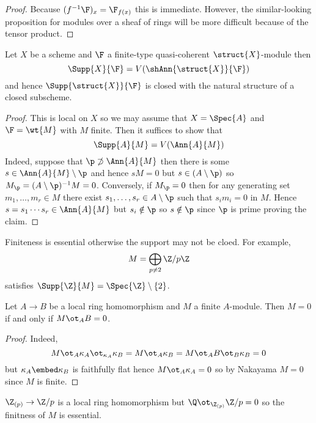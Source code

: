 \documentclass[12pt]{article}
\begin{document}
\begin{proof}
Because $(f^{-1} \F)_x = \F_{f(x)}$ this is immediate. However, the similar-looking proposition for modules over a sheaf of rings will be more difficult because of the tensor product.
\end{proof}

\begin{prop}
Let $X$ be a scheme and $\F$ a finite-type quasi-coherent $\struct{X}$-module then
\[ \Supp{X}{\F} = V(\shAnn{\struct{X}}{\F}) \]
and hence $\Supp{\struct{X}}{\F}$ is closed with the natural structure of a closed subscheme.
\end{prop}

\begin{proof}
This is local on $X$ so we may assume that $X = \Spec{A}$ and $\F = \wt{M}$ with $M$ finite. Then it suffices to show that
\[ \Supp{A}{M} = V(\Ann{A}{M}) \]
Indeed, suppose that $\p \not\supset \Ann{A}{M}$ then there is some $s \in \Ann{A}{M} \setminus \p$ and hence $s M = 0$ but $s \in (A \setminus \p)$ so $M_\p = (A \setminus \p)^{-1} M = 0$. Conversely, if $M_\p = 0$ then for any generating set $m_1, \dots, m_r \in M$ there exist $s_1, \dots, s_r \in A \setminus \p$ such that $s_i m_i = 0$ in $M$. Hence $s = s_1 \cdots s_r \in \Ann{A}{M}$ but $s_i \notin \p$ so $s \notin \p$ since $\p$ is prime proving the claim.
\end{proof}

\begin{example}
Finiteness is essential otherwise the support may not be cloed. For example,
\[ M = \bigoplus_{p \neq 2} \Z / p \Z \]
satisfies $\Supp{\Z}{M} = \Spec{\Z} \setminus \{ 2 \}$.
\end{example}

\begin{prop}
Let $A \to B$ be a local ring homomorphism and $M$ a finite $A$-module. Then $M = 0$ if and only if $M \ot_A B = 0$.
\end{prop}

\begin{proof}
Indeed, 
\[ M \ot_A \kappa_A \ot_{\kappa_A} \kappa_B = M \ot_A \kappa_B = M \ot_A B \ot_B \kappa_B = 0 \]
but $\kappa_A \embed \kappa_B$ is faithfully flat hence $M \ot_A \kappa_A = 0$ so by Nakayama $M = 0$ since $M$ is finite.
\end{proof}

\begin{example}
$\Z_{(p)} \to \Z / p$ is a local ring homomorphism but $\Q \ot_{\Z_{(p)}} \Z / p = 0$ so the finitness of $M$ is essential.
\end{example}
\end{document}
